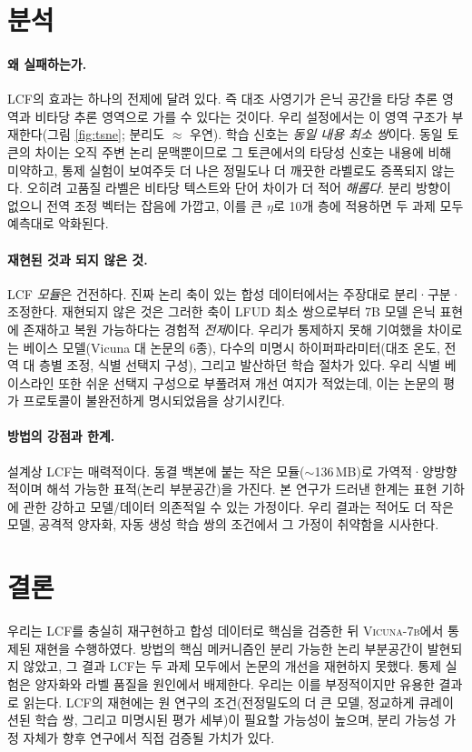 \documentclass[11pt]{article}
\begin{document}
\section{분석}\label{sec:analysis}
\paragraph{왜 실패하는가.} LCF의 효과는 하나의 전제에 달려 있다. 즉 대조 사영기가 은닉
공간을 타당 추론 영역과 비타당 추론 영역으로 가를 수 있다는 것이다. 우리 설정에서는 이
영역 구조가 부재한다(그림 \ref{fig:tsne}; 분리도 $\approx$ 우연). 학습 신호는 \emph{동일
내용 최소 쌍}이다. 동일 토큰의 차이는 오직 주변 논리 문맥뿐이므로 그 토큰에서의 타당성
신호는 내용에 비해 미약하고, 통제 실험이 보여주듯 더 나은 정밀도나 더 깨끗한 라벨로도
증폭되지 않는다. 오히려 고품질 라벨은 비타당 텍스트와 단어 차이가 더 적어 \emph{해롭다}.
분리 방향이 없으니 전역 조정 벡터는 잡음에 가깝고, 이를 큰 $\eta$로 10개 층에 적용하면
두 과제 모두 예측대로 악화된다.

\paragraph{재현된 것과 되지 않은 것.} LCF \emph{모듈}은 건전하다. 진짜 논리 축이 있는
합성 데이터에서는 주장대로 분리·구분·조정한다. 재현되지 않은 것은 그러한 축이 LFUD 최소
쌍으로부터 7B 모델 은닉 표현에 존재하고 복원 가능하다는 경험적 \emph{전제}이다. 우리가
통제하지 못해 기여했을 차이로는 베이스 모델(Vicuna 대 논문의 6종), 다수의 미명시
하이퍼파라미터(대조 온도, 전역 대 층별 조정, 식별 선택지 구성), 그리고 발산하던 학습
절차가 있다. 우리 식별 베이스라인 또한 쉬운 선택지 구성으로 부풀려져 개선 여지가 적었는데,
이는 논문의 평가 프로토콜이 불완전하게 명시되었음을 상기시킨다.

\paragraph{방법의 강점과 한계.} 설계상 LCF는 매력적이다. 동결 백본에 붙는 작은
모듈($\sim$136\,MB)로 가역적·양방향적이며 해석 가능한 표적(논리 부분공간)을 가진다. 본
연구가 드러낸 한계는 표현 기하에 관한 강하고 모델/데이터 의존적일 수 있는 가정이다. 우리
결과는 적어도 더 작은 모델, 공격적 양자화, 자동 생성 학습 쌍의 조건에서 그 가정이
취약함을 시사한다.

\section{결론}
우리는 LCF를 충실히 재구현하고 합성 데이터로 핵심을 검증한 뒤 \textsc{Vicuna-7b}에서
통제된 재현을 수행하였다. 방법의 핵심 메커니즘인 분리 가능한 논리 부분공간이 발현되지
않았고, 그 결과 LCF는 두 과제 모두에서 논문의 개선을 재현하지 못했다. 통제 실험은
양자화와 라벨 품질을 원인에서 배제한다. 우리는 이를 부정적이지만 유용한 결과로 읽는다.
LCF의 재현에는 원 연구의 조건(전정밀도의 더 큰 모델, 정교하게 큐레이션된 학습 쌍, 그리고
미명시된 평가 세부)이 필요할 가능성이 높으며, 분리 가능성 가정 자체가 향후 연구에서 직접
검증될 가치가 있다.
\end{document}
